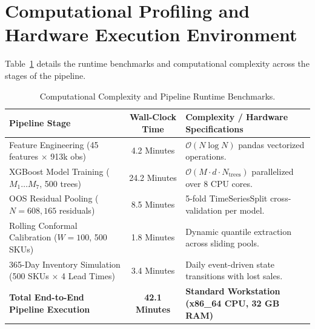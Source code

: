 \section{Computational Profiling and Hardware Execution Environment}
\label{app:computational_profiling}

Table~\ref{tab:app_computational} details the runtime benchmarks and computational complexity across the stages of the pipeline.

\begin{table}[htbp]
\centering
\small
\caption{Computational Complexity and Pipeline Runtime Benchmarks.}
\label{tab:app_computational}
\begin{tabular}{lcp{8.5cm}}
\toprule
\textbf{Pipeline Stage} & \textbf{Wall-Clock Time} & \textbf{Complexity / Hardware Specifications} \\
\midrule
Feature Engineering (45 features $\times$ 913k obs) & 4.2 Minutes & $\mathcal{O}(N \log N)$ pandas vectorized operations. \\
XGBoost Model Training ($M_1 \dots M_7$, 500 trees) & 24.2 Minutes & $\mathcal{O}(M \cdot d \cdot N_{\text{trees}})$ parallelized over 8 CPU cores. \\
OOS Residual Pooling ($N = 608,165$ residuals) & 8.5 Minutes & 5-fold TimeSeriesSplit cross-validation per model. \\
Rolling Conformal Calibration ($W=100$, 500 SKUs) & 1.8 Minutes & Dynamic quantile extraction across sliding pools. \\
365-Day Inventory Simulation (500 SKUs $\times$ 4 Lead Times) & 3.4 Minutes & Daily event-driven state transitions with lost sales. \\
\midrule
\textbf{Total End-to-End Pipeline Execution} & \textbf{42.1 Minutes} & \textbf{Standard Workstation (x86\_64 CPU, 32 GB RAM)} \\
\bottomrule
\end{tabular}
\end{table}
